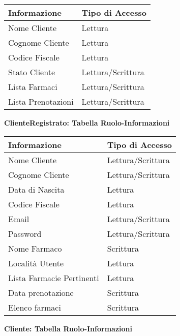 \begin{tabular} {|P{7cm}|P{7cm}|}
    \hline
    \textbf{Informazione} & \textbf{Tipo di Accesso} \\
    \hline
    Nome Cliente          & Lettura                  \\
    \hline
    Cognome Cliente       & Lettura                  \\
    \hline
    Codice Fiscale        & Lettura                  \\
    \hline
    Stato Cliente         & Lettura/Scrittura        \\
    \hline
    Lista Farmaci         & Lettura/Scrittura        \\
    \hline
    Lista Prenotazioni    & Lettura/Scrittura        \\
    \hline
\end{tabular}
\hfill \break
\hfill \break

\textbf{ClienteRegistrato: Tabella Ruolo-Informazioni}
\hfill \break

\begin{tabular} {|P{7cm}|P{7cm}|}
    \hline
    \textbf{Informazione}     & \textbf{Tipo di Accesso} \\
    \hline
    Nome Cliente              & Lettura/Scrittura        \\
    \hline
    Cognome Cliente           & Lettura/Scrittura        \\
    \hline
    Data di Nascita           & Lettura                  \\
    \hline
    Codice Fiscale            & Lettura                  \\
    \hline
    Email                     & Lettura/Scrittura        \\
    \hline
    Password                  & Lettura/Scrittura        \\
    \hline
    Nome Farmaco              & Scrittura                \\
    \hline
    Località Utente           & Lettura                  \\
    \hline
    Lista Farmacie Pertinenti & Lettura                  \\
    \hline
    Data prenotazione         & Scrittura                \\
    \hline
    Elenco farmaci            & Scrittura                \\
    \hline
\end{tabular}
\hfill \break

\textbf{Cliente: Tabella Ruolo-Informazioni}
\hfill \break

